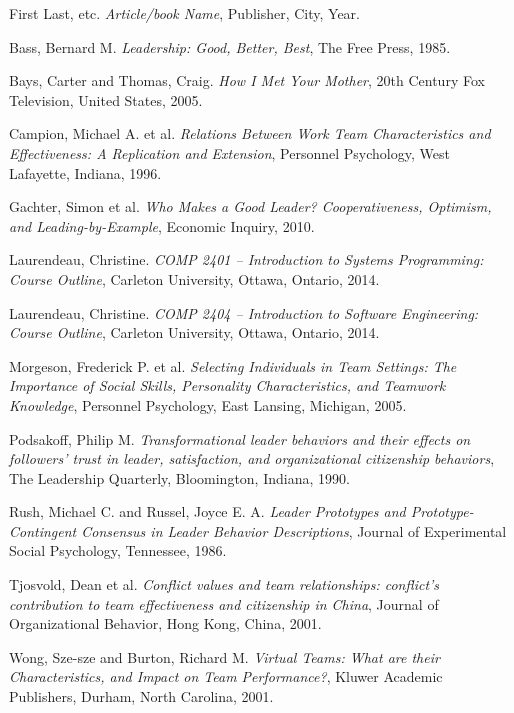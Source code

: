 \documentclass[12pt,letterpaper]{article}
\begin{document}
\begin{thebibliography}{16}

First Last, etc.
{\it Article/book Name},
Publisher, City, Year.

Bass, Bernard M.
{\it Leadership: Good, Better, Best},
The Free Press, 1985.

Bays, Carter and Thomas, Craig.
{\it How I Met Your Mother},
20th Century Fox Television, United States, 2005.

Campion, Michael A. et al.
{\it Relations Between Work Team Characteristics and Effectiveness: A Replication and Extension},
Personnel Psychology, West Lafayette, Indiana, 1996.

Gachter, Simon et al.
{\it Who Makes a Good Leader? Cooperativeness, Optimism, and Leading-by-Example},
Economic Inquiry, 2010.

Laurendeau, Christine.
{\it COMP 2401 -- Introduction to Systems Programming: Course Outline},
Carleton University, Ottawa, Ontario, 2014.

Laurendeau, Christine.
{\it COMP 2404 -- Introduction to Software Engineering: Course Outline},
Carleton University, Ottawa, Ontario, 2014.

Morgeson, Frederick P. et al.
{\it Selecting Individuals in Team Settings: The Importance of Social Skills, Personality Characteristics, and Teamwork Knowledge},
Personnel Psychology, East Lansing, Michigan, 2005.

Podsakoff, Philip M.
{\it Transformational leader behaviors and their effects on followers' trust in leader, satisfaction, and organizational citizenship behaviors},
The Leadership Quarterly, Bloomington, Indiana, 1990.

Rush, Michael C. and Russel, Joyce E. A.
{\it Leader Prototypes and Prototype-Contingent Consensus in Leader Behavior Descriptions},
Journal of Experimental Social Psychology, Tennessee, 1986.

Tjosvold, Dean et al.
{\it Conflict values and team relationships: conflict's contribution to team effectiveness and citizenship in China},
Journal of Organizational Behavior, Hong Kong, China, 2001.

Wong, Sze-sze and Burton, Richard M.
{\it Virtual Teams: What are their Characteristics, and Impact on Team Performance?},
Kluwer Academic Publishers, Durham, North Carolina, 2001.

\end{thebibliography}
\end{document}
